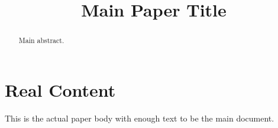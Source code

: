 \documentclass{article}
\title{Main Paper Title}
\begin{document}
\begin{abstract}
Main abstract.
\end{abstract}
\section{Real Content}
This is the actual paper body with enough text to be the main document.
\end{document}
